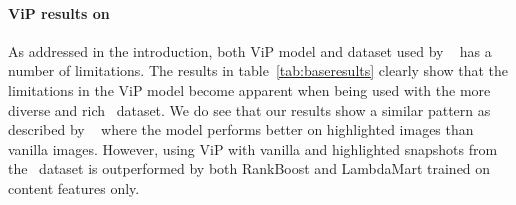 


\paragraph{ViP results on \datasetname}
As addressed in the introduction, both ViP model and dataset used by ~\citet{fan2017learning} has a number of limitations. The results in table~\ref{tab:baseresults} clearly show that the limitations in the ViP model become apparent when being used with the more diverse and rich \datasetname~dataset. We do see that our results show a similar pattern as described by ~\citet{fan2017learning} where the model performs better on highlighted images than vanilla images. However, using ViP with vanilla and highlighted snapshots from the \datasetname~dataset is outperformed by both RankBoost and LambdaMart trained on content features only. 


